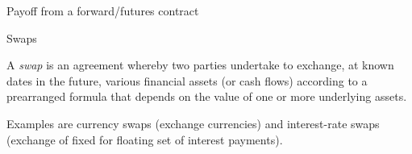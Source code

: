 
{Payoff from a forward/futures contract}
\begin{figure}
  \centering
   \qquad
\end{figure}

{Swaps}
\item<1->
A {\it swap} is an agreement whereby two parties
undertake to exchange, at known dates in the future, various
financial assets (or cash flows) according to a prearranged
formula that depends on the value of one or more underlying
assets.
\item<2->
Examples are currency swaps (exchange currencies) and
interest-rate swaps (exchange of fixed for floating set of
interest payments).

